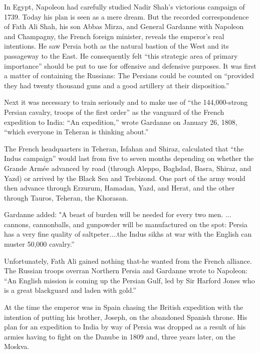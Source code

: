 In Egypt, Napoleon had carefully studied Nadir Shah's victorious campaign of 1739. Today his plan is seen as a mere dream. But the recorded correspondence of Fath Ali Shah, his son Abbas Mirza, and General Gardanne with Napoleon and Champagny, the French foreign minister, reveals the emperor's real intentions. He saw Persia both as the natural bastion of the West and its passageway to the East. He consequently felt “this strategic area of primary importance” should be put to use for offensive and defensive purposes. It was first a matter of containing the Russians: The Persians could be counted on “provided they had twenty thousand guns and a good artillery at their disposition.” 

Next it was necessary to train seriously and to make use of “the 144,000-strong Persian cavalry, troops of the first order” as the vanguard of the French expedition to India: “An expedition,” wrote Gardanne on January 26, 1808, “which everyone in Teheran is thinking about.” 

The French headquarters in Teheran, Isfahan and Shiraz, calculated that “the Indus campaign” would last from five to seven months depending on whether the Grande Armée advanced by road (through Aleppo, Baghdad, Basra, Shiraz, and Yazd) or arrived by the Black Sea and Trebizond. One part of the army would then advance through Erzurum, Hamadan, Yazd, and Herat, and the other through Tauros, Teheran, the Khorasan. 

Gardanne added: "A beast of burden will be needed for every two men. ... cannons, cannonballs, and gunpowder will be manufactured on the spot: Persia has a very fine quality of saltpeter....the Indus sikhs at war with the English can muster 50,000 cavalry.” 

Unfortunately, Fath Ali gained nothing that-he wanted from the French alliance. The Russian troops overran Northern Persia and Gardanne wrote to Napoleon: “An English mission is coming up the Persian Gulf, led by Sir Harford Jones who is a great blackguard and laden with gold.” 

At the time the emperor was in Spain chasing the British expedition with the intention of putting his brother, Joseph, on the abandoned Spanish throne. His plan for an expedition to India by way of Persia was dropped as a result of his armies having to fight on the Danube in 1809 and, three years later, on the Moskva. 

